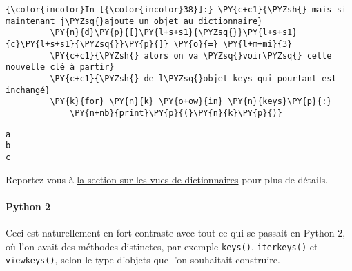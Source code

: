     \begin{Verbatim}[commandchars=\\\{\}]
{\color{incolor}In [{\color{incolor}38}]:} \PY{c+c1}{\PYZsh{} mais si maintenant j\PYZsq{}ajoute un objet au dictionnaire}
         \PY{n}{d}\PY{p}{[}\PY{l+s+s1}{\PYZsq{}}\PY{l+s+s1}{c}\PY{l+s+s1}{\PYZsq{}}\PY{p}{]} \PY{o}{=} \PY{l+m+mi}{3}
         \PY{c+c1}{\PYZsh{} alors on va \PYZsq{}voir\PYZsq{} cette nouvelle clé à partir}
         \PY{c+c1}{\PYZsh{} de l\PYZsq{}objet keys qui pourtant est inchangé}
         \PY{k}{for} \PY{n}{k} \PY{o+ow}{in} \PY{n}{keys}\PY{p}{:}
             \PY{n+nb}{print}\PY{p}{(}\PY{n}{k}\PY{p}{)}
\end{Verbatim}


    \begin{Verbatim}[commandchars=\\\{\}]
a
b
c

    \end{Verbatim}

    Reportez vous à
\href{https://docs.python.org/3/library/stdtypes.html\#dictionary-view-objects}{la
section sur les vues de dictionnaires} pour plus de détails.

    \hypertarget{python-2}{%
\paragraph{Python 2}\label{python-2}}

    Ceci est naturellement en fort contraste avec tout ce qui se passait en
Python 2, où l'on avait des méthodes distinctes, par exemple
\texttt{keys()}, \texttt{iterkeys()} et \texttt{viewkeys()}, selon le
type d'objets que l'on souhaitait construire.


    
    
    
